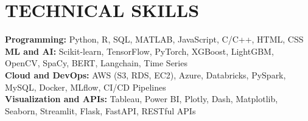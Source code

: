 \documentclass[10pt]{article}
\begin{document}
\vspace{-0.4cm} 
\section*{TECHNICAL SKILLS} 
\vspace{-0.2cm}
\noindent
\textbf{Programming:} Python, R, SQL, MATLAB, JavaScript, C/C++, HTML, CSS \\
\textbf{ML and AI:} Scikit-learn, TensorFlow, PyTorch, XGBoost, LightGBM, OpenCV, SpaCy, BERT, Langchain, Time Series \\
\textbf{Cloud and DevOps:} AWS (S3, RDS, EC2), Azure, Databricks, PySpark, MySQL, Docker, MLflow, CI/CD Pipelines \\
\textbf{Visualization and APIs:} Tableau, Power BI, Plotly, Dash, Matplotlib, Seaborn, Streamlit, Flask, FastAPI, RESTful APIs
\end{document}
